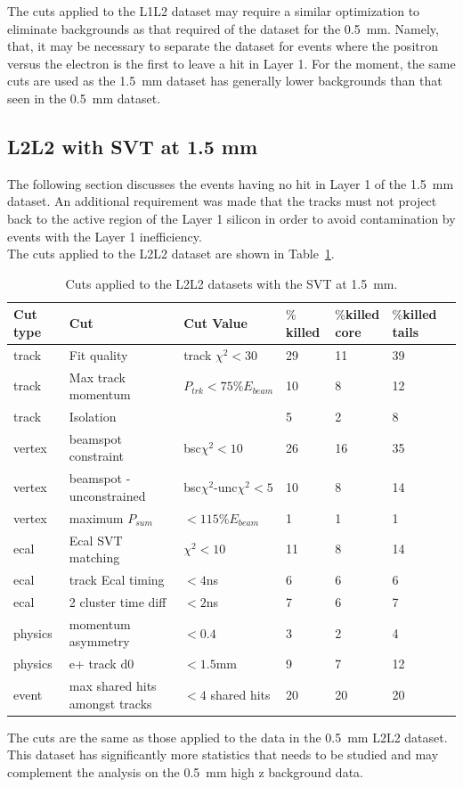 The cuts applied to the L1L2 dataset may require a similar optimization to eliminate backgrounds as that required of the dataset for the 0.5~mm. Namely, that, it may be necessary to separate the dataset for events where the positron versus the electron is the first to leave a hit in Layer 1. For the moment, the same cuts are used as the 1.5~mm dataset has generally lower backgrounds than that seen in the 0.5~mm dataset.

\subsection{L2L2 with SVT at 1.5 mm}
The following section discusses the events having no hit in Layer 1 of the 1.5~mm dataset. An additional requirement was made that the tracks must not project back to the active region of the Layer 1 silicon in order to avoid contamination by events with the Layer 1 inefficiency. \\
\indent The cuts applied to the L2L2 dataset are shown in Table~\ref{l2l2_cuts_1p5}.

\begin{table}[H]
\caption{Cuts applied to the L2L2 datasets with the SVT at 1.5~mm.}
\label{l2l2_cuts_1p5}
\centering
\begin{tabular}{lllllll}
\toprule
Cut type & Cut & Cut Value &  $\%$killed &  $\%$killed core & $\%$killed tails\\
\midrule
track & Fit quality & track $\chi^{2}<30$ & 29 & 11 & 39 \\
track & Max track momentum &  $P_{trk}<75\%E_{beam}$ & 10 & 8 & 12 \\
track & Isolation &   & 5 & 2 & 8 \\
vertex & beamspot constraint & bsc$\chi^{2}<10$  & 26 & 16 & 35 \\
vertex & beamspot - unconstrained & bsc$\chi^{2}$-unc$\chi^2<5$  & 10 & 8 & 14 \\
vertex & maximum $P_{sum}$ &  $<115\%E_{beam}$ & 1 & 1 & 1 \\
ecal & Ecal SVT matching & $\chi^2<10$  & 11 & 8 & 14 \\
ecal & track Ecal timing & $<4$ns  & 6 & 6 & 6 \\
ecal & 2 cluster time diff & $<2$ns  & 7 & 6 & 7 \\
physics & momentum asymmetry & $<0.4$  & 3 & 2 & 4 \\
physics & e+ track d0 & $<1.5$mm  & 9 & 7 & 12 \\
event & max shared hits amongst tracks & $<4$ shared hits  & 20 & 20 & 20 \\
\bottomrule
\end{tabular}
\end{table}

The cuts are the same as those applied to the data in the 0.5~mm L2L2 dataset. This dataset has significantly more statistics that needs to be studied and may complement the analysis on the 0.5~mm high z background data. 